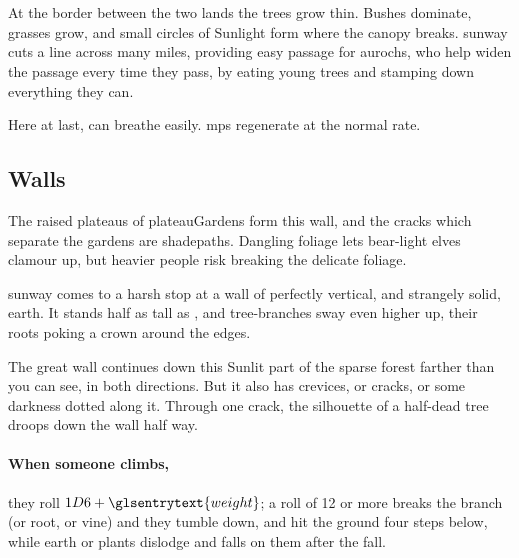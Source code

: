 
\section{}
\label{sunway}

At the border between the two lands the trees grow thin.
Bushes dominate, grasses grow, and small circles of Sunlight form where the canopy breaks.
\Gls{sunway} cuts a line across many miles, providing easy passage for aurochs, who help widen the passage every time they pass, by eating young trees and stamping down everything they can.

Here at last,  can breathe easily.
\Glspl{mp} regenerate at the normal rate.


\begin{multicols}{2}

\subsection{ Walls}

The raised plateaus of \gls{plateauGardens} form this wall, and the cracks which separate the gardens are \gls{shadepaths}.
Dangling foliage lets bear-light elves clamour up, but heavier people risk breaking the delicate foliage.

\begin{boxtext}
  \Gls{sunway} comes to a harsh stop at a wall of perfectly vertical, and strangely solid, earth.
  It stands half as tall as , and tree-branches sway even higher up, their roots poking a crown around the edges.

  The great wall continues down this Sunlit part of the sparse forest farther than you can see, in both directions.
  But it also has crevices, or cracks, or some darkness dotted along it.
  Through one crack, the silhouette of a half-dead tree droops down the wall half way.
\end{boxtext}

\paragraph{When someone climbs,}
they roll $1D6 + \glsentrytext{weight}$; a roll of 12 or more breaks the branch (or root, or vine) and they tumble down, and hit the ground four \glspl{step} below, while earth or plants dislodge and falls on them after the fall.


\end{multicols}
